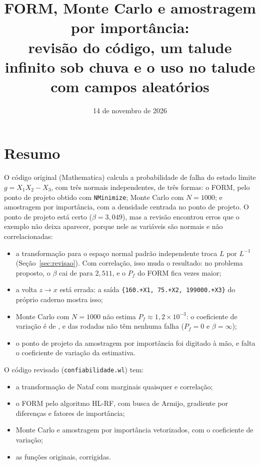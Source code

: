 \documentclass[11pt,a4paper]{article}
\title{FORM, Monte Carlo e amostragem por importância:\\[2pt]
  revisão do código, um talude infinito sob chuva e o uso no talude com campos aleatórios}
\author{}
\date{14 de novembro de 2026}
\begin{document}
\maketitle
\tableofcontents

\section{Resumo}
\label{sec:resumo}

O código original (Mathematica) calcula a probabilidade de falha do estado limite $g = X_1 X_2 - X_3$, com três
normais independentes, de três formas: o FORM, pelo ponto de projeto obtido com \texttt{NMinimize}; Monte Carlo com
$N = 1000$; e amostragem por importância, com a densidade centrada no ponto de projeto. O ponto de projeto está certo
($\beta = 3{,}049$), mas a revisão encontrou erros que o exemplo não deixa aparecer, porque nele as variáveis são
normais e não correlacionadas:
\begin{itemize}
  \item a transformação para o espaço normal padrão independente troca $L$ por $L^{-1}$ (Seção~\ref{sec:revisao}). Com
    correlação, isso muda o resultado: no problema proposto, o $\beta$ cai de \pDoisABeta{} para $2{,}511$, e o $P_f$
    do FORM fica \pDoisAErroL{} vezes maior;
  \item a volta $z \to x$ está errada: a saída \texttt{\{160.+X1, 75.+X2, 199000.+X3\}} do próprio caderno mostra isso;
  \item Monte Carlo com $N = 1000$ não estima $P_f \approx 1{,}2 \times 10^{-3}$: o coeficiente de variação é de
    \pUmCovMCmil, e \pUmZeroMC{} das rodadas não têm nenhuma falha ($P_f = 0$ e $\beta = \infty$);
  \item o ponto de projeto da amostragem por importância foi digitado à mão, e falta o coeficiente de variação da
    estimativa.
\end{itemize}

O código revisado (\texttt{confiabilidade.wl}) tem:
\begin{itemize}
  \item a transformação de Nataf com marginais quaisquer e correlação;
  \item o FORM pelo algoritmo HL-RF, com busca de Armijo, gradiente por diferenças e fatores de importância;
  \item Monte Carlo e amostragem por importância vetorizados, com o coeficiente de variação;
  \item as funções originais, corrigidas.
\end{itemize}
\end{document}
